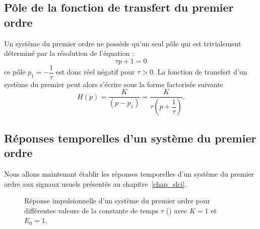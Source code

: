 \subsection{Pôle de la fonction de transfert du premier ordre}
Un système du premier ordre ne possède qu'un seul pôle qui est trivialement 
déterminé par la résolution de l'équation :
$$
\tau p + 1 =0
$$
ce pôle $p_1=-\dfrac{1}{\tau}$ est donc réel négatif pour $\tau>0$.
La fonction de transfert d'un système du premier peut alors s'écrire 
sous la forme factorisée suivante
$$
H(p)=\dfrac{K}{(p-p_1)}=\dfrac{K}{\tau\left(p+\dfrac{1}{\tau}\right)}.
$$

\subsection{Réponses temporelles d'un système du premier ordre}
Nous allons maintenant établir les réponses temporelles d'un système 
du premier ordre aux signaux usuels présentés au chapitre~\cref{chap_slci}.

\begin{figure}[!t]
\begin{center}
\caption{Réponse impulsionnelle d'un système du premier ordre pour différentes valeurs
    de la constante de temps $\tau$  () avec $K=1$ et $E_0=1$.\label{fig-1er_imp}}
\end{center}
\end{figure}

